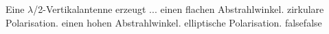     {Eine $\lambda$/2-Vertikalantenne erzeugt ...}
    {einen flachen Abstrahlwinkel.}
    {zirkulare Polarisation.}
    {einen hohen Abstrahlwinkel.}
    {elliptische Polarisation.}
    {false}{false}